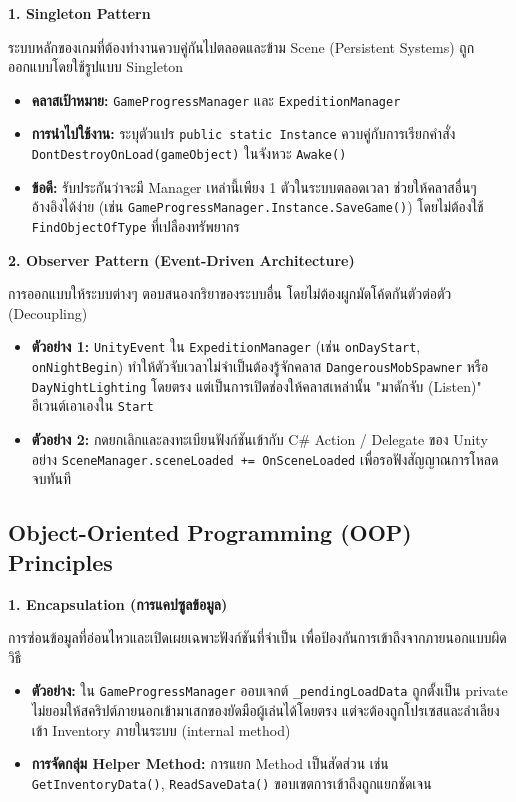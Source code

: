 \textbf{1. Singleton Pattern}

ระบบหลักของเกมที่ต้องทำงานควบคู่กันไปตลอดและข้าม Scene (Persistent Systems) ถูกออกแบบโดยใช้รูปแบบ Singleton

\begin{itemize}
\item \textbf{คลาสเป้าหมาย:} \texttt{GameProgressManager} และ \texttt{ExpeditionManager}
\item \textbf{การนำไปใช้งาน:} ระบุตัวแปร \texttt{public static Instance} ควบคู่กับการเรียกคำสั่ง \texttt{DontDestroyOnLoad(gameObject)} ในจังหวะ \texttt{Awake()}
\item \textbf{ข้อดี:} รับประกันว่าจะมี Manager เหล่านี้เพียง 1 ตัวในระบบตลอดเวลา ช่วยให้คลาสอื่นๆ อ้างอิงได้ง่าย (เช่น \texttt{GameProgressManager.Instance.SaveGame()}) โดยไม่ต้องใช้ \texttt{FindObjectOfType} ที่เปลืองทรัพยากร
\end{itemize}

\textbf{2. Observer Pattern (Event-Driven Architecture)}

การออกแบบให้ระบบต่างๆ ตอบสนองกริยาของระบบอื่น โดยไม่ต้องผูกมัดโค้ดกันตัวต่อตัว (Decoupling)

\begin{itemize}
\item \textbf{ตัวอย่าง 1:} \texttt{UnityEvent} ใน \texttt{ExpeditionManager} (เช่น \texttt{onDayStart}, \texttt{onNightBegin}) ทำให้ตัวจับเวลาไม่จำเป็นต้องรู้จักคลาส \texttt{DangerousMobSpawner} หรือ \texttt{DayNightLighting} โดยตรง แต่เป็นการเปิดช่องให้คลาสเหล่านั้น "มาดักจับ (Listen)" อีเวนต์เอาเองใน \texttt{Start}
\item \textbf{ตัวอย่าง 2:} กดยกเลิกและลงทะเบียนฟังก์ชันเข้ากับ C\# Action / Delegate ของ Unity อย่าง \texttt{SceneManager.sceneLoaded += OnSceneLoaded} เพื่อรอฟังสัญญาณการโหลดจบทันที
\end{itemize}

\subsection{Object-Oriented Programming (OOP) Principles}

\textbf{1. Encapsulation (การแคปซูลข้อมูล)}

การซ่อนข้อมูลที่อ่อนไหวและเปิดเผยเฉพาะฟังก์ชันที่จำเป็น เพื่อป้องกันการเข้าถึงจากภายนอกแบบผิดวิธี

\begin{itemize}
\item \textbf{ตัวอย่าง:} ใน \texttt{GameProgressManager} ออบเจกต์ \texttt{\_pendingLoadData} ถูกตั้งเป็น private ไม่ยอมให้สคริปต์ภายนอกเข้ามาเสกของยัดมือผู้เล่นได้โดยตรง แต่จะต้องถูกโปรเซสและลำเลียงเข้า Inventory ภายในระบบ (internal method)
\item \textbf{การจัดกลุ่ม Helper Method:} การแยก Method เป็นสัดส่วน เช่น \texttt{GetInventoryData()}, \texttt{ReadSaveData()} ขอบเขตการเข้าถึงถูกแยกชัดเจน
\end{itemize}

